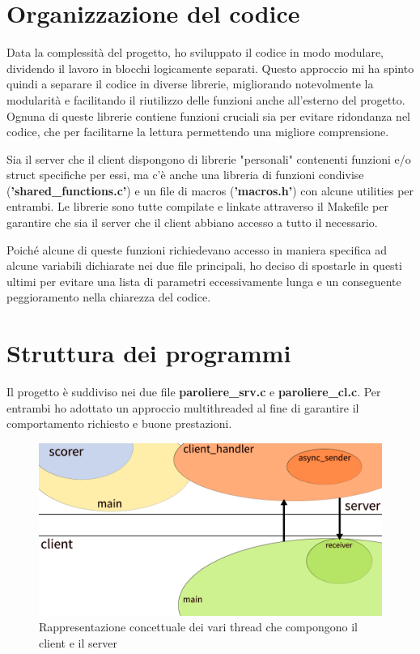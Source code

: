 \documentclass[a4paper]{article}
\begin{document}
    
    
    \section{Organizzazione del codice}
    Data la complessità del progetto, ho sviluppato il codice in modo modulare, dividendo il lavoro in blocchi logicamente separati. Questo approccio mi ha spinto quindi a separare il codice in diverse librerie, migliorando notevolmente la modularità e facilitando il riutilizzo delle funzioni anche all'esterno del progetto. Ognuna di queste librerie contiene funzioni cruciali sia per evitare ridondanza nel codice, che per facilitarne la lettura permettendo una migliore comprensione. 
    
    Sia il server che il client dispongono di librerie "personali" contenenti funzioni e/o struct specifiche per essi, ma c'è anche una libreria di funzioni condivise (\textbf{'shared\_functions.c'}) e un file di macros (\textbf{'macros.h'}) con alcune utilities per entrambi. Le librerie sono tutte compilate e linkate attraverso il Makefile per garantire che sia il server che il client abbiano accesso a tutto il necessario. 
    
    Poiché alcune di queste funzioni richiedevano accesso in maniera specifica ad alcune variabili dichiarate nei due file principali, ho deciso di spostarle in questi ultimi per evitare una lista di parametri eccessivamente lunga e un conseguente peggioramento nella chiarezza del codice.


    
    \section{Struttura dei programmi}
    Il progetto è suddiviso nei due file \textbf{paroliere\_srv.c} e \textbf{paroliere\_cl.c}. Per entrambi ho adottato un approccio multithreaded al fine di garantire il comportamento richiesto e buone prestazioni.
    \begin{figure}[!htb]
        \centering
        \includegraphics[keepaspectratio=true,scale=0.22]{scheme.png}
        Rappresentazione concettuale dei vari thread che compongono il client e il server
    \end{figure}
    
\end{document}
